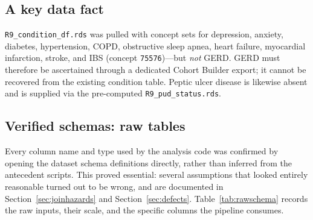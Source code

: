 \documentclass[11pt]{article}
\newcommand{\code}[1]{\texttt{\small #1}}
\begin{document}
\subsection{A key data fact}
\code{R9_condition_df.rds} was pulled with concept sets for depression, anxiety, diabetes,
hypertension, COPD, obstructive sleep apnea, heart failure, myocardial infarction, stroke, and IBS
(concept \code{75576})---but \emph{not} GERD. GERD must therefore be ascertained through a dedicated
Cohort Builder export; it cannot be recovered from the existing condition table. Peptic ulcer disease
is likewise absent and is supplied via the pre-computed \code{R9_pud_status.rds}.


\subsection{Verified schemas: raw tables}
\label{sec:schemas}
Every column name and type used by the analysis code was confirmed by opening the dataset schema
definitions directly, rather than inferred from the antecedent scripts. This proved essential: several
assumptions that looked entirely reasonable turned out to be wrong, and are documented in
Section~\ref{sec:joinhazards} and Section~\ref{sec:defects}. Table~\ref{tab:rawschema} records the raw
inputs, their scale, and the specific columns the pipeline consumes.
\end{document}
